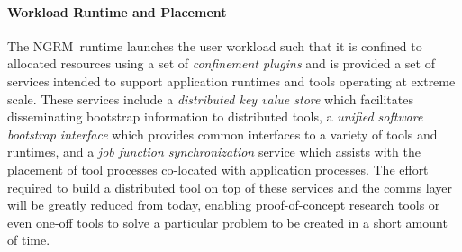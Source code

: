 \documentclass[10pt]{article}
\newcommand{\ngrm}{NGRM}
\begin{document}
\paragraph{Workload Runtime and Placement}
The \ngrm\ runtime launches the user workload such that it is confined
to allocated resources using a set of {\em confinement plugins}
and is provided a set of services intended to support application
runtimes and tools operating at extreme scale.
These services include a {\em distributed key value store} which facilitates
disseminating bootstrap information to distributed tools,
a {\em unified software bootstrap interface} which provides common
interfaces to a variety of tools and runtimes, and
a {\em job function synchronization} service which assists with the placement
of tool processes co-located with application processes.
The effort required to build a distributed tool on top of these services
and the comms layer will be greatly reduced from today, enabling
proof-of-concept research tools or even one-off tools to solve a particular
problem to be created in a short amount of time.









%

\appendix



%



\end{document}
